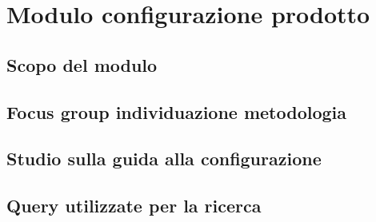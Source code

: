 \documentclass[12pt, a4paper]{article}
\begin{document}
\newpage
\section{Modulo configurazione prodotto}
\subsection{Scopo del modulo}
\subsection{Focus group individuazione metodologia}
\subsection{Studio sulla guida alla configurazione}
\subsection{Query utilizzate per la ricerca}
\end{document}
